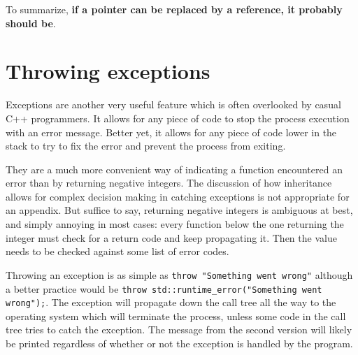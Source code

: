 \documentclass[10pt,a4paper]{book}
\begin{document}
To summarize, \textbf{if a pointer can be replaced by a reference, it probably should be}.

\section{Throwing exceptions}

Exceptions are another very useful feature which is often overlooked by casual C++ programmers. It allows for any piece of code to stop the process execution with an error message. Better yet, it allows for any piece of code lower in the stack to try to fix the error and prevent the process from exiting.

They are a much more convenient way of indicating a function encountered an error than by returning negative integers. The discussion of how inheritance allows for complex decision making in catching exceptions is not appropriate for an appendix. But suffice to say, returning negative integers is ambiguous at best, and simply annoying in most cases: every function below the one returning the integer must check for a return code and keep propagating it. Then the value needs to be checked against some list of error codes.

Throwing an exception is as simple as \Verb`throw "Something went wrong"` although a better practice would be \Verb`throw std::runtime_error("Something went wrong");`. The exception will propagate down the call tree all the way to the operating system which will terminate the process, unless some code in the call tree tries to catch the exception. The message from the second version will likely be printed regardless of whether or not the exception is handled by the program.
\end{document}
